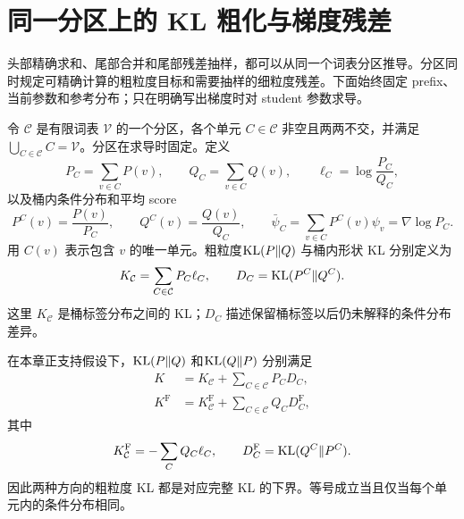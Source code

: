 \section{同一分区上的 KL 粗化与梯度残差}
\label{inf:sec:kl-partition-geometry}
\label{inf:sec:kl-partition}

头部精确求和、尾部合并和尾部残差抽样，都可以从同一个词表分区推导。分区同时规定可精确计算的粗粒度目标和需要抽样的细粒度残差。下面始终固定 prefix、当前参数和参考分布；只在明确写出梯度时对 student 参数求导。

\begin{definition}[词表分区与桶内分布]
令 $\mathcal C$ 是有限词表 $\mathcal V$ 的一个分区，各个单元 $C\in\mathcal C$ 非空且两两不交，并满足 $\bigcup_{C\in\mathcal C}C=\mathcal V$。分区在求导时固定。定义
\begin{equation*}
 P_C=\sum_{v\in C}P(v),\qquad
 Q_C=\sum_{v\in C}Q(v),\qquad
 \ell_C=\log\frac{P_C}{Q_C},
\end{equation*}
以及桶内条件分布和平均 score
\begin{equation*}
 P^C(v)=\frac{P(v)}{P_C},\qquad
 Q^C(v)=\frac{Q(v)}{Q_C},\qquad
 \bar \psi_C=\sum_{v\in C}P^C(v)\psi_v=\nabla\log P_C.
\end{equation*}
用 $C(v)$ 表示包含 $v$ 的唯一单元。粗粒度$\operatorname{KL}(P\Vert Q)$ 与桶内形状 KL 分别定义为
\begin{equation*}
 K_{\mathcal C}=\sum_{C\in\mathcal C}P_C\ell_C,
 \qquad D_C=\operatorname{KL}(P^C\Vert Q^C).
\end{equation*}
这里 $K_{\mathcal C}$ 是桶标签分布之间的 KL；$D_C$ 描述保留桶标签以后仍未解释的条件分布差异。
\end{definition}

\begin{theorem}
\label{inf:thm:kl-partition-chain}
在本章正支持假设下，$\operatorname{KL}(P\Vert Q)$ 和$\operatorname{KL}(Q\Vert P)$ 分别满足
\begin{align}
 K&=K_{\mathcal C}+\sum_{C\in\mathcal C}P_CD_C,
 \label{inf:eq:kl-partition-chain-reverse}\\
 K^{\mathrm F}&=K^{\mathrm F}_{\mathcal C}
       +\sum_{C\in\mathcal C}Q_CD^{\mathrm F}_C,
 \label{inf:eq:kl-partition-chain-forward}
\end{align}
其中
\begin{equation*}
 K^{\mathrm F}_{\mathcal C}=-\sum_CQ_C\ell_C,
 \qquad D_C^{\mathrm F}=\operatorname{KL}(Q^C\Vert P^C).
\end{equation*}
因此两种方向的粗粒度 KL 都是对应完整 KL 的下界。等号成立当且仅当每个单元内的条件分布相同。
\end{theorem}

